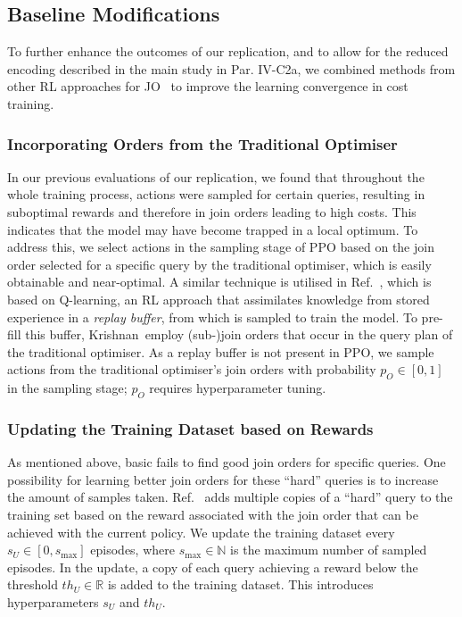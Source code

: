 \documentclass[10pt, conference]{IEEEtran}
\begin{document}
\subsection{Baseline Modifications}\label{sec:mod}
To further enhance the outcomes of our replication, and to allow for the reduced encoding described in the main study in Par. IV-C2a, we combined methods from other RL approaches for JO~\cite{krishnan18, xiang20} to improve the learning convergence in cost training.

\subsubsection{Incorporating Orders from the Traditional Optimiser}
\label{subsec:mod-trad}

In our previous evaluations of our replication, we found that throughout the whole training process, actions were sampled for certain queries, resulting in suboptimal rewards and therefore in join orders leading to high costs.
This indicates that the model may have become trapped in a local optimum.
To address this, we select actions in the sampling stage of PPO based on the join order selected for a specific query by the traditional optimiser, which is easily obtainable and near-optimal.
A similar technique is utilised in Ref.~\cite{krishnan18}, which is based on Q-learning, an RL approach that assimilates knowledge from stored experience in a \emph{replay buffer}, from which is sampled to train the model.
To pre-fill this buffer, Krishnan~\etal employ (sub-)join orders that occur in the query plan of the traditional optimiser.
As a replay buffer is not present in PPO, we sample actions from the traditional optimiser's join orders with probability $p_{O} \in [0, 1]$ in the sampling stage; $p_{O}$ requires hyperparameter tuning.

\subsubsection{Updating the Training Dataset based on Rewards}
\label{subsec:mod-update}
As mentioned above, basic \rj fails to find good join orders for specific queries.
One possibility for learning better join orders for these \enquote{hard} queries is to increase the amount of samples taken.
Ref.~\cite{xiang20} adds multiple copies of a \enquote{hard} query to the training set based on the reward associated with the join order that can be achieved with the current policy.
We update the training dataset every $s_U \in [0, s_{\text{max}}]$ episodes, where $s_{\text{max}} \in \mathbb{N}$ is the maximum number of sampled episodes.
In the update, a copy of each query achieving a reward below the threshold $th_U \in \mathbb{R}$ is added to the training dataset. This introduces hyperparameters $s_U$ and $th_U$.
\end{document}
